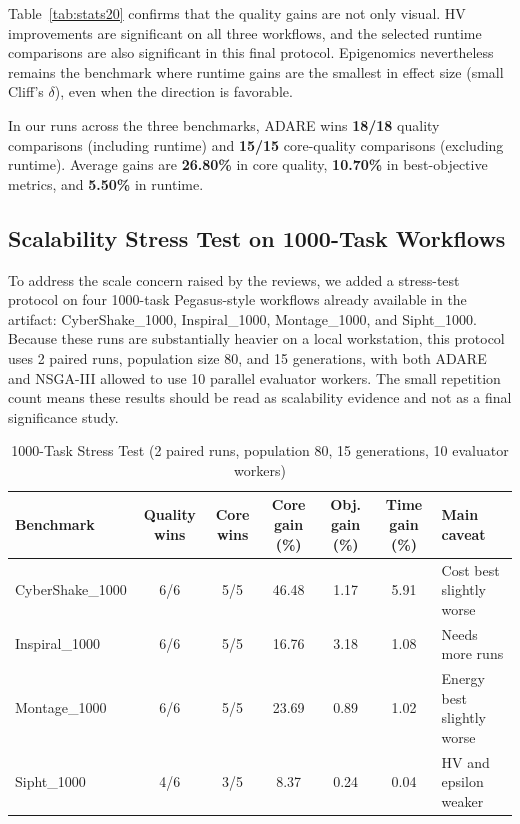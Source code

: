 \documentclass[runningheads]{llncs}
\begin{document}
Table~\ref{tab:stats20} confirms that the quality gains are not only visual. HV improvements are significant on all three workflows, and the selected runtime comparisons are also significant in this final protocol. Epigenomics nevertheless remains the benchmark where runtime gains are the smallest in effect size (small Cliff's $\delta$), even when the direction is favorable.

In our runs across the three benchmarks, ADARE wins \textbf{18/18} quality comparisons (including runtime) and \textbf{15/15} core-quality comparisons (excluding runtime). Average gains are \textbf{26.80\%} in core quality, \textbf{10.70\%} in best-objective metrics, and \textbf{5.50\%} in runtime.

\subsection{Scalability Stress Test on 1000-Task Workflows}
To address the scale concern raised by the reviews, we added a stress-test protocol on four 1000-task Pegasus-style workflows already available in the artifact: CyberShake\_1000, Inspiral\_1000, Montage\_1000, and Sipht\_1000. Because these runs are substantially heavier on a local workstation, this protocol uses 2 paired runs, population size 80, and 15 generations, with both ADARE and NSGA-III allowed to use 10 parallel evaluator workers. The small repetition count means these results should be read as scalability evidence and not as a final significance study.

\begin{table}[H]
\caption{1000-Task Stress Test (2 paired runs, population 80, 15 generations, 10 evaluator workers)}
\label{tab:stress1000}
\centering
\scriptsize
\begin{tabularx}{\textwidth}{@{}lccccc>{\raggedright\arraybackslash}X@{}}
\toprule
Benchmark & Quality wins & Core wins & Core gain (\%) & Obj. gain (\%) & Time gain (\%) & Main caveat \\
\midrule
CyberShake\_1000 & 6/6 & 5/5 & 46.48 & 1.17 & 5.91 & Cost best slightly worse \\
Inspiral\_1000 & 6/6 & 5/5 & 16.76 & 3.18 & 1.08 & Needs more runs \\
Montage\_1000 & 6/6 & 5/5 & 23.69 & 0.89 & 1.02 & Energy best slightly worse \\
Sipht\_1000 & 4/6 & 3/5 & 8.37 & 0.24 & 0.04 & HV and epsilon weaker \\
\bottomrule
\end{tabularx}
\end{table}
\end{document}
